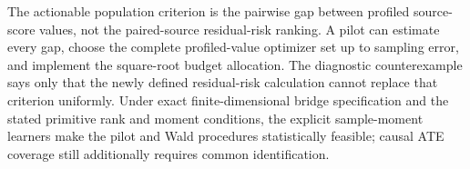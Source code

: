 The actionable population criterion is the pairwise gap between profiled source-score values, not the paired-source residual-risk ranking.  A pilot can estimate every gap, choose the complete profiled-value optimizer set up to sampling error, and implement the square-root budget allocation.  The diagnostic counterexample says only that the newly defined residual-risk calculation cannot replace that criterion uniformly.  Under exact finite-dimensional bridge specification and the stated primitive rank and moment conditions, the explicit sample-moment learners make the pilot and Wald procedures statistically feasible; causal ATE coverage still additionally requires common identification.